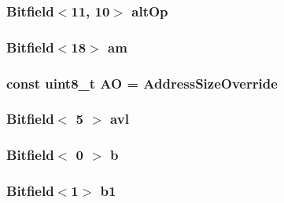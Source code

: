 \label{namespaceX86ISA_aaccf902caa5b987fcd9cf699d04caa3a}
\hypertarget{namespaceX86ISA_a88e1c884eaf94e7cabc69033f23bf58f}{
\subsubsection[{altOp}]{\setlength{\rightskip}{0pt plus 5cm}Bitfield$<$11, 10$>$ {\bf altOp}}}
\label{namespaceX86ISA_a88e1c884eaf94e7cabc69033f23bf58f}
\hypertarget{namespaceX86ISA_a7202af197ecd3b331e51cc55a7d45984}{
\subsubsection[{am}]{\setlength{\rightskip}{0pt plus 5cm}Bitfield$<$18$>$ {\bf am}}}
\label{namespaceX86ISA_a7202af197ecd3b331e51cc55a7d45984}
\hypertarget{namespaceX86ISA_a50db8efe7d4acc2cae436f1ecea8a664}{
\subsubsection[{AO}]{\setlength{\rightskip}{0pt plus 5cm}const uint8\_\-t {\bf AO} = AddressSizeOverride}}
\label{namespaceX86ISA_a50db8efe7d4acc2cae436f1ecea8a664}
\hypertarget{namespaceX86ISA_a64b27f5ab0883ac3f59ecff143dfa629}{
\subsubsection[{avl}]{\setlength{\rightskip}{0pt plus 5cm}Bitfield$<$ 5 $>$ {\bf avl}}}
\label{namespaceX86ISA_a64b27f5ab0883ac3f59ecff143dfa629}
\hypertarget{namespaceX86ISA_aa1dc72da091616d43719bbad476ed8c4}{
\subsubsection[{b}]{\setlength{\rightskip}{0pt plus 5cm}Bitfield$<$ 0 $>$ {\bf b}}}
\label{namespaceX86ISA_aa1dc72da091616d43719bbad476ed8c4}
\hypertarget{namespaceX86ISA_a66555249fda949dad20c4b90ea4fb029}{
\subsubsection[{b1}]{\setlength{\rightskip}{0pt plus 5cm}Bitfield$<$1$>$ {\bf b1}}}
